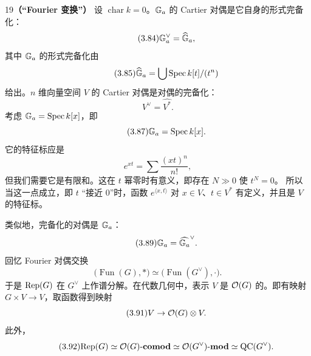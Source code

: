 \begin{srcex}{19}\textbf{（“Fourier 变换”）}
设 $\operatorname{char}k=0$。$\mathbb{G}_a$ 的 Cartier 对偶是它自身的形式完备化：
\begin{equation}\tag{3.84}
\mathbb{G}_a^{\vee}=\widehat{\mathbb{G}}_a,
\end{equation}
其中 $\mathbb{G}_a$ 的形式完备化由
\begin{equation}\tag{3.85}
\widehat{\mathbb{G}}_a=\bigcup\mathrm{Spec}\,k[t]/(t^{n})
\end{equation}
给出。$n$ 维向量空间 $V$ 的 Cartier 对偶是对偶的完备化：
\begin{equation}\tag{3.86}
V^{\vee}=\widehat{V^{*}}.
\end{equation}
考虑 $\mathbb{G}_a=\mathrm{Spec}\,k[x]$，即
\begin{equation}\tag{3.87}
\mathbb{G}_a=\mathrm{Spec}\,k[x].
\end{equation}
它的特征标应是
\begin{equation}\tag{3.88}
e^{xt}=\sum\frac{(xt)^{n}}{n!},
\end{equation}
但我们需要它是有限和。这在 $t$ 幂零时有意义，即存在 $N\gg0$ 使 $t^{N}=0$。
所以当这一点成立，即 $t$ “接近 $0$”时，函数 $e^{\langle x,t\rangle}$ 对 $x\in V$、$t\in V^{*}$ 有定义，并且是 $V$ 的特征标。

类似地，完备化的对偶是 $\mathbb{G}_a$：
\begin{equation}\tag{3.89}
\mathbb{G}_a=\widehat{\mathbb{G}_a}^{\vee}.
\end{equation}
回忆 Fourier 对偶交换
\begin{equation}\tag{3.90}
\bigl(\operatorname{Fun}(G),\ast\bigr)\simeq\bigl(\operatorname{Fun}(G^{\vee}),\cdot\bigr).
\end{equation}
于是 $\mathrm{Rep}(G)$ 在 $G^{\vee}$ 上作谱分解。在代数几何中，表示 $V$ 是 $\mathcal{O}(G)$ 的。即有映射 $G\times V\to V$，取函数得到映射
\begin{equation}\tag{3.91}
V\to\mathcal{O}(G)\otimes V.
\end{equation}
此外，
\begin{equation}\tag{3.92}
\mathrm{Rep}(G)\simeq\mathcal{O}(G)\text{-}\mathbf{comod}\simeq\mathcal{O}(G^{\vee})\text{-}\mathbf{mod}\simeq\mathrm{QC}(G^{\vee}).
\end{equation}
\end{srcex}

